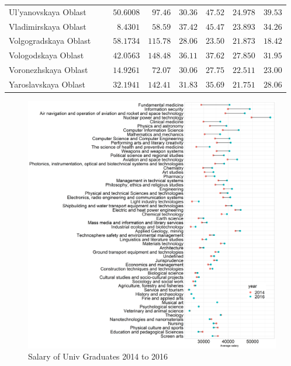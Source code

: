 \documentclass[alpha-refs]{wiley-article-05g}
\begin{document}
{\begin{longtable}{lcccccc}
Ul'yanovskaya Oblast  & $\phantom{0}\phantom{-}50.6008$ & $\phantom{0}97.46$ & $30.36$ & $47.52$ & $24.978$ & $39.53$ \\
Vladimirskaya Oblast  & $\phantom{00}\phantom{-}8.4301$ & $\phantom{0}58.59$ & $37.42$ & $45.47$ & $23.893$ & $34.26$ \\
Volgogradskaya Oblast  & $\phantom{0}\phantom{-}58.1734$ & $115.78$ & $28.06$ & $23.50$ & $21.873$ & $18.42$ \\
Vologodskaya Oblast  & $\phantom{0}\phantom{-}42.0563$ & $148.48$ & $36.11$ & $37.62$ & $27.850$ & $31.95$ \\
Voronezhskaya Oblast  & $\phantom{0}\phantom{-}14.9261$ & $\phantom{0}72.07$ & $30.06$ & $27.75$ & $22.511$ & $23.00$ \\
Yaroslavskaya Oblast  & $\phantom{0}\phantom{-}32.1941$ & $142.41$ & $31.83$ & $35.69$ & $21.751$ & $28.06$ \\
		\hline 
	\end{longtable}
 
}
 

\begin{center}
	\begin{figure}[htbp!]
\begin{minipage}[b]{1\linewidth}
			\centering
			\includegraphics[width=6in]{sal_area.png}
		\end{minipage}
			\caption{Salary of Univ Graduates 2014 to 2016}\label{fig:7.6}
	\end{figure}
\end{center}
\end{document}
